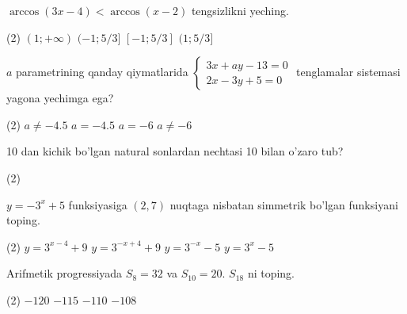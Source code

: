\documentclass[14pt]{article}
\begin{document}
\begin{taskbox}
\(\arccos(3x - 4) < \arccos(x - 2)\) tengsizlikni yeching.
 \vspace{0.2cm} \begin{tasks}(2)
\task \((1; +\infty)\)
\task \((-1; 5/3]\)
\task \([-1; 5/3]\)
\task \((1; 5/3]\)
\end{tasks}
\vspace{2cm}
\end{taskbox}

\begin{taskbox}
\(a\) parametrining qanday qiymatlarida \(\begin{cases} 3x + ay - 13 = 0 \\ 2x - 3y + 5 = 0 \end{cases}\) tenglamalar sistemasi yagona yechimga ega?
 \vspace{0.2cm} \begin{tasks}(2)
\task \(a \neq -4.5\)
\task \(a = -4.5\)
\task \(a = -6\)
\task \(a \neq -6\)
\end{tasks}
\vspace{2cm}
\end{taskbox}

\begin{taskbox}
10 dan kichik bo'lgan natural sonlardan nechtasi 10 bilan o'zaro tub?
 \vspace{0.2cm} \begin{tasks}(2)
\end{tasks}
\vspace{2cm}
\end{taskbox}

\begin{taskbox}
\(y = -3^x + 5\) funksiyasiga \((2,7)\) nuqtaga nisbatan simmetrik bo'lgan funksiyani toping.
 \vspace{0.2cm} \begin{tasks}(2)
\task \(y = 3^{x-4} + 9\)
\task \(y = 3^{-x+4} + 9\)
\task \(y = 3^{-x} - 5\)
\task \(y = 3^{x} - 5\)
\end{tasks}
\vspace{2cm}
\end{taskbox}

\begin{taskbox}
Arifmetik progressiyada \(S_8 = 32\) va \(S_{10} = 20\). \(S_{18}\) ni toping.
 \vspace{0.2cm} \begin{tasks}(2)
\task \(-120\)
\task \(-115\)
\task \(-110\)
\task \(-108\)
\end{tasks}
\vspace{2cm}
\end{taskbox}
\end{document}
